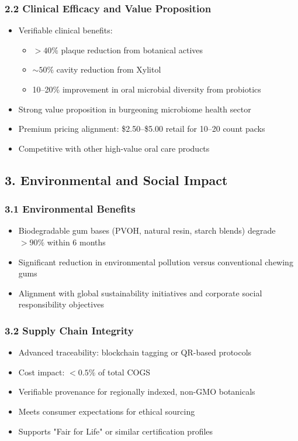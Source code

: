 \documentclass[12pt]{article}
\begin{document}
\subsubsection*{2.2 Clinical Efficacy and Value Proposition}
\begin{itemize}
    \item Verifiable clinical benefits:
    \begin{itemize}
        \item $>40\%$ plaque reduction from botanical actives
        \item $\sim50\%$ cavity reduction from Xylitol 
        \item 10--20\% improvement in oral microbial diversity from probiotics 
    \end{itemize}
    \item Strong value proposition in burgeoning microbiome health sector
    \item Premium pricing alignment: \$2.50--\$5.00 retail for 10--20 count packs
    \item Competitive with other high-value oral care products
\end{itemize}

\subsection*{3. Environmental and Social Impact}

\subsubsection*{3.1 Environmental Benefits}
\begin{itemize}
    \item Biodegradable gum bases (PVOH, natural resin, starch blends) degrade $>90\%$ within 6 months
    \item Significant reduction in environmental pollution versus conventional chewing gums
    \item Alignment with global sustainability initiatives and corporate social responsibility objectives
\end{itemize}

\subsubsection*{3.2 Supply Chain Integrity}
\begin{itemize}
    \item Advanced traceability: blockchain tagging or QR-based protocols
    \item Cost impact: $<0.5\%$ of total COGS
    \item Verifiable provenance for regionally indexed, non-GMO botanicals
    \item Meets consumer expectations for ethical sourcing
    \item Supports "Fair for Life" or similar certification profiles
\end{itemize}
\end{document}
